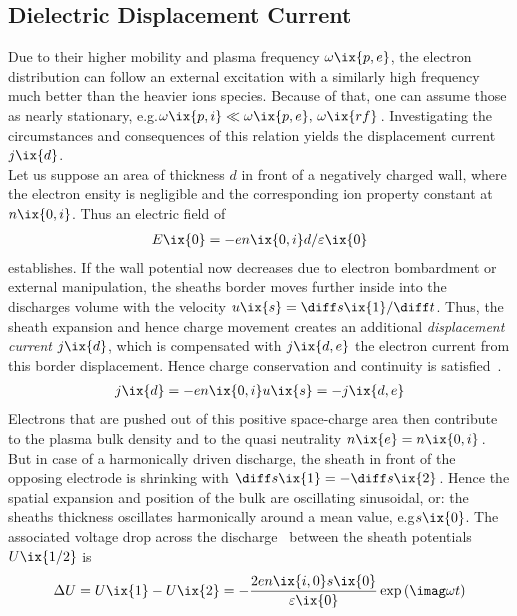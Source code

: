 %			
			\subsection{Dielectric Displacement Current}\label{sec:displacementcurrent}
%
				Due to their higher mobility and plasma frequency $\omega\ix{p,e}$, the electron distribution can follow an external excitation with a similarly high frequency much better than the heavier ions species. Because of that, one can assume those as nearly stationary, e.g.\@ $\omega\ix{p,i}\ll\omega\ix{p,e},\,\omega\ix{rf}\,$. Investigating the circumstances and consequences of this relation yields the displacement current $j\ix{d}$. \\
				Let us suppose an area of thickness $d$ in front of a negatively charged wall, where the electron ensity is negligible and the corresponding ion property constant at $n\ix{0,i}$. Thus an electric field of
%   	 
				\begin{align}
					E\ix{0}=-en\ix{0,i}d/\varepsilon\ix{0}
				\end{align}
%
				establishes. If the wall potential now decreases due to electron bombardment or external manipulation, the sheaths border moves further inside into the discharges volume with the velocity $u\ix{s}=\diff s\ix{1}/\diff t$. Thus, the sheath expansion and hence charge movement creates an additional \emph{displacement current} $j\ix{d}$, which is compensated with $j\ix{d,e}$ the electron current from this border displacement. Hence charge conservation and continuity is satisfied~\cite{Godyak90a}.
%
				\begin{align}
					j\ix{d}=-en\ix{0,i}u\ix{s}=-j\ix{d,e}
				\end{align}
%
				Electrons that are pushed out of this positive space-charge area then contribute to the plasma bulk density and to the quasi neutrality $n\ix{e}=n\ix{0,i}\,$. But in case of a harmonically driven discharge, the sheath in front of the opposing electrode is shrinking with $\diff s\ix{1}=-\diff s\ix{2}\,$. Hence the spatial expansion and position of the bulk are oscillating sinusoidal, or: the sheaths thickness oscillates harmonically around a mean value, e.g\@ $s\ix{0}$. The associated voltage drop across the discharge~\cite{Piel10} between the sheath potentials $U\ix{1/2}$ is
%
				\begin{align}
					\Delta U=U\ix{1}-U\ix{2}=-\frac{2en\ix{i,0}s\ix{0}}%
						{\varepsilon\ix{0}}\exp\left(\imag\omega t\right)
				\end{align}
